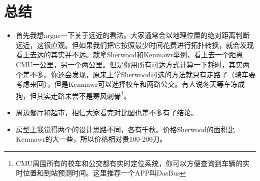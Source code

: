 \documentclass[nofonts,a4paper,11pt]{article}
\begin{document}
\section{总结}

\begin{itemize}
	\item 首先我想argue一下关于远近的看法。大家通常会以地理位置的绝对距离判断远近，这很直观。但如果我们把它按照最少时间花费进行拓扑转换，就会发现看上去远的其实并不远。就拿Sherwood和Kenmawr举例，看上去一个距离CMU一公里，另一个两公里。但是你用所有可达方式计算一下耗时，其实两个差不多。你还会发现，原来上学Sherwood可选的方法就只有走路了（骑车要考虑来回），但是Kenmawr可以选择校车和两路公交。有人说冬天等车冻成狗，但其实走路未尝不是寒风刺骨\footnote{CMU周围所有的校车和公交都有实时定位系统，你可以方便查询到车辆的实时位置和到站预测时间。这里推荐一个APP叫DasBus}。
	\item 周边餐厅和超市，相信大家看完对比图也差不多有了结论。
	\item 房型上我觉得两个的设计思路不同，各有千秋。价格Sherwood的面积比Kenmawr的大一些，所以价格相对贵100-200刀。
\end{itemize}
\end{document}

